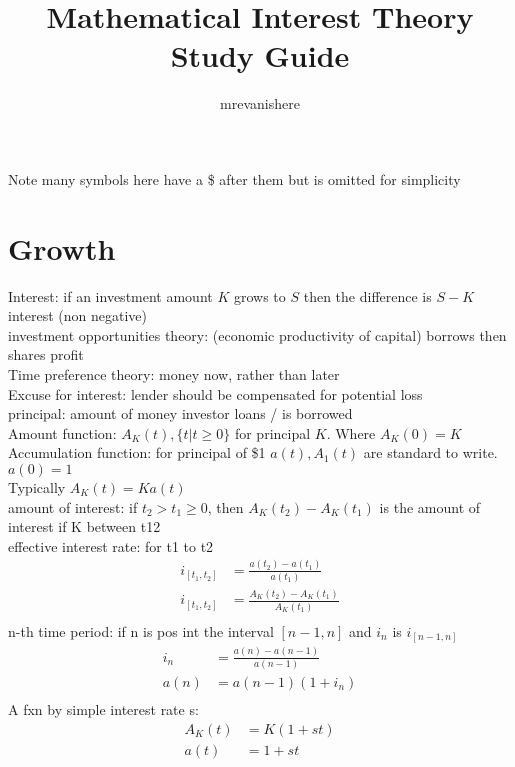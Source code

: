 \documentclass[12pt]{article}
\begin{document}
\title{Mathematical Interest Theory Study Guide}
\author{mrevanishere}
\maketitle

Note many symbols here have a \$ after them but is omitted for simplicity 
\section{Growth}
	Interest: if an investment amount $ K $ grows to $ S $ then the difference is
	$ S - K $ interest (non negative)\\
	investment opportunities theory: (economic productivity of capital) borrows
	then shares profit \\
	Time preference theory: money now, rather than later \\
	Excuse for interest: lender should be compensated for potential loss \\
	principal: amount of money investor loans / is borrowed \\
	Amount function: $ A_K(t), \{t|t \ge 0\} $ for principal $K $.
	Where $ A_K(0) = K $\\
	Accumulation function: for principal of \$1 $ a(t), A_1(t) $ are standard to write.
	$ a(0) = 1 $\\
	Typically $ A_K(t) = Ka(t) $ \\
	amount of interest: if $ t_2 > t_1 \ge 0 $, then
	$ A_K(t_2) - A_K(t_1) $ is the amount of interest if K between t12 \\
	effective interest rate: for t1 to t2
	\begin{align*}
		i_{[t_1, t_2]} &= \frac{a(t_2) - a(t_1)}{a(t_1)} \\
		i_{[t_1, t_2]} &= \frac{A_K(t_2) - A_K(t_1)}{A_K(t_1)} \\
	\end{align*}
	n-th time period: if n is pos int the interval $ [n-1, n] $ and 
	$ i_n $ is $ i_{[n-1, n]} $
	\begin{align*}
		i_n &= \frac{a(n) - a(n-1)}{a(n-1)} \\
		a(n) &= a(n-1)(1 + i_n) \\
	\end{align*}
	A fxn by simple interest rate s:
	\begin{align*}
		A_K(t) &=  K(1 + st) \\
		a(t) &= 1 + st \\
	\end{align*}
\end{document}
